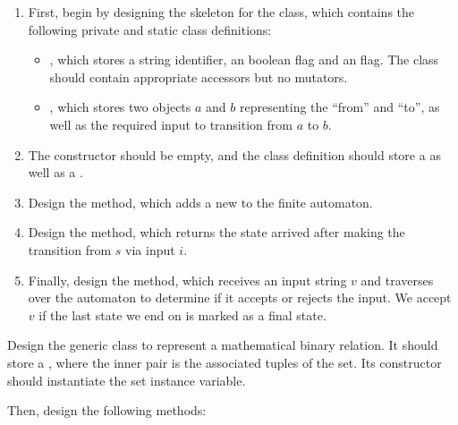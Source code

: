 \begin{enumerate}[label=(\alph*)]
    \item First, begin by designing the skeleton for the  class, which contains the following private and static class definitions:
    \begin{itemize}
        \item {}, which stores a string identifier, an  boolean flag and an  flag. The class should contain appropriate accessors but no mutators.
        \item {}, which stores two  objects $a$ and $b$ representing the ``from'' and ``to'', as well as the required input to transition from $a$ to $b$. 
    \end{itemize}
    \item The  constructor should be empty, and the class definition should store a  as well as a . 
    \item Design the  method, which adds a new  to the finite automaton.
    \item Design the  method, which returns the state arrived after making the transition from $s$ via input $i$.
    \item Finally, design the  method, which receives an input string $v$ and traverses over the automaton to determine if it accepts or rejects the input. We accept $v$ if the last state we end on is marked as a final state.
\end{enumerate}


Design the generic  class to represent a mathematical binary relation. It should store a , where the inner pair is the associated tuples of the set. Its constructor should instantiate the set instance variable. 

Then, design the following methods:

